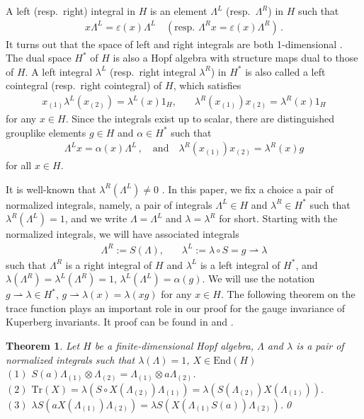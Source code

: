 \documentclass[12pt]{amsart}
\newtheorem{theorem}{Theorem}
\begin{document}
A left (resp.~right) integral in $H$ is an element $\Lambda^L$ (resp.~$\Lambda^R$) in $H$ such that
\[\begin{aligned}
	x\Lambda^L=\varepsilon(x)\Lambda^L \quad (\text{resp.~}\Lambda^Rx=\varepsilon(x)\Lambda^R)\,.
\end{aligned}\] 
It turns out that the space of left and right integrals are both 1-dimensional \cite{Sweedler1969}. The dual space $H^*$ of $H$ is also a Hopf algebra with structure maps dual to those of $H$. A left integral $\lambda^L$ (resp.~right integral $\lambda^R$) in $H^*$ is also called a left cointegral (resp.~right cointegral) of $H$, which satisfies 
\[\begin{aligned}
	x_{(1)}\lambda^L(x_{(2)})=\lambda^L(x)1_H,~~~~~~~~\lambda^R(x_{(1)})x_{(2)}=\lambda^R(x)1_H
\end{aligned}\]
for any $x\in H$. Since the integrals exist up to scalar, there are distinguished grouplike elements $g\in H$ and $\alpha\in H^*$ such that
\[\begin{aligned}
	\Lambda^Lx=\alpha(x)\Lambda^L\,,\quad\text{and}\quad\lambda^R(x_{(1)})x_{(2)}=\lambda^R(x)g
\end{aligned}\]
for all $x \in H$.

It is well-known that $\lambda^R(\Lambda^L)\neq 0$ \cite{Rad90}. In this paper, we fix a choice a pair of normalized integrals, namely, a pair of integrals $\Lambda^L \in H$ and $\lambda^R \in H^*$ such that $\lambda^R(\Lambda^L)=1$, and we write $\Lambda=\Lambda^L$ and $\lambda=\lambda^R$ for short. Starting with the normalized integrals, we will have associated integrals
\[\begin{aligned}
	\Lambda^R:=S(\Lambda),~~~~~~~~\lambda^L:=\lambda\circ S=g\rightharpoonup\lambda
\end{aligned}\]
such that $\Lambda^R$ is a right integral of $H$ and $\lambda^L$ is a left integral of $H^*$, and $\lambda(\Lambda^R)=\lambda^L(\Lambda^R)=1$, $\lambda^L(\Lambda^L)=\alpha(g)$. We will use the notation $g\rightharpoonup\lambda\in H^*$, $g\rightharpoonup\lambda(x)=\lambda(xg)$ for any $x \in H$. The following theorem on the trace function plays an important role in our proof for the gauge invariance of Kuperberg invariants. It proof can be found in \cite{Rad94} and \cite{CNW25}.  

\begin{theorem}\label{integral}
Let $H$ be a finite-dimensional Hopf algebra, $\Lambda$ and $\lambda$ is a pair of normalized integrals such that $\lambda(\Lambda)=1$, $X\in \mathrm{End}(H)$ \\
\noindent$(1)$ $S(a)\Lambda_{(1)}\otimes \Lambda_{(2)}=\Lambda_{(1)}\otimes a\Lambda_{(2)}$.\\
\noindent$(2)$ $\mathrm{Tr}(X)=\lambda(S\circ X(\Lambda_{(2)})\Lambda_{(1)})=\lambda(S(\Lambda_{(2)})X(\Lambda_{(1)})).$\\
\noindent$(3)$ $\lambda S(aX(\Lambda_{(1)})\Lambda_{(2)})=\lambda S(X(\Lambda_{(1)}S(a))\Lambda_{(2)})$.\qed
\end{theorem}
\end{document}
